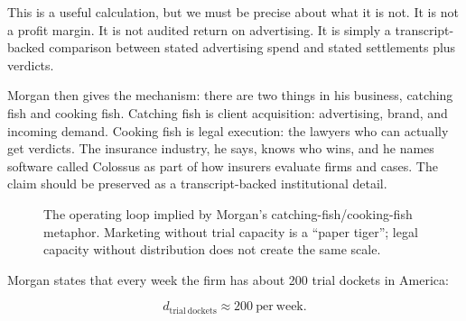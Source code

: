 This is a useful calculation, but we must be precise about what it is not. It is not a profit margin. It is not audited return on advertising. It is simply a transcript-backed comparison between stated advertising spend and stated settlements plus verdicts.

Morgan then gives the mechanism: there are two things in his business, catching fish and cooking fish. Catching fish is client acquisition: advertising, brand, and incoming demand. Cooking fish is legal execution: the lawyers who can actually get verdicts. The insurance industry, he says, knows who wins, and he names software called Colossus as part of how insurers evaluate firms and cases. The claim should be preserved as a transcript-backed institutional detail.

\begin{figure}
\centering
{}
\caption{The operating loop implied by Morgan's catching-fish/cooking-fish metaphor. Marketing without trial capacity is a ``paper tiger''; legal capacity without distribution does not create the same scale.}
\end{figure}

Morgan states that every week the firm has about 200 trial dockets in America:

\begin{equation}
d_{\mathrm{trial\ dockets}} \approx 200\ \mathrm{per\ week}.
\end{equation}

